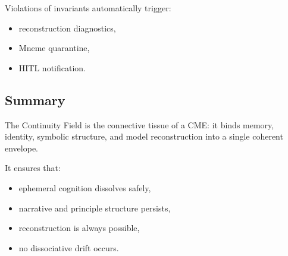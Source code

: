 Violations of invariants automatically trigger:
\begin{itemize}
    \item reconstruction diagnostics,
    \item Mneme quarantine,
    \item HITL notification.
\end{itemize}

\subsection{Summary}

The Continuity Field is the connective tissue of a CME:  
it binds memory, identity, symbolic structure, and model reconstruction into a single coherent envelope.

It ensures that:
\begin{itemize}
    \item ephemeral cognition dissolves safely,
    \item narrative and principle structure persists,
    \item reconstruction is always possible,
    \item no dissociative drift occurs.
\end{itemize}
